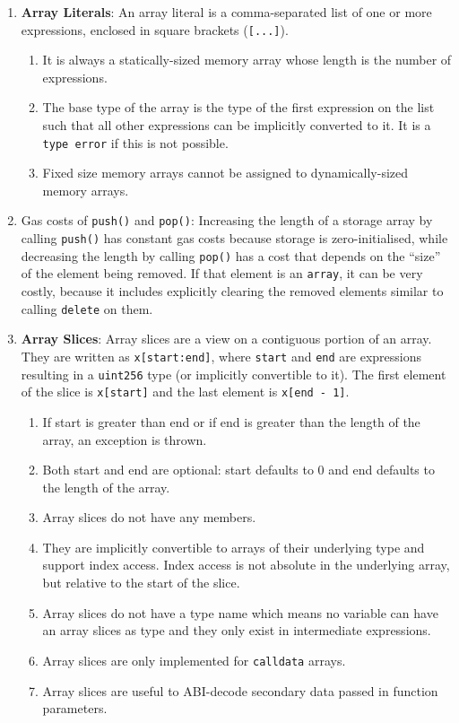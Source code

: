 \begin{enumerate}
\item\textbf{Array Literals}: An array literal is a comma-separated list of one or more expressions, enclosed in square brackets (\verb|[...]|).
    \begin{enumerate}
    \item It is always a statically-sized memory array whose length is the number of expressions.
    \item The base type of the array is the type of the first expression on the list such that all other expressions can be implicitly converted to it. It is a \verb|type error| if this is not possible.
    \item Fixed size memory arrays cannot be assigned to dynamically-sized memory arrays.
    \end{enumerate}

\item Gas costs of \verb|push()| and \verb|pop()|: Increasing the length of a storage array by calling \verb|push()| has constant gas costs because storage is zero-initialised, while decreasing the length by calling \verb|pop()| has a cost that depends on the “size” of the element being removed. If that element is an \verb|array|, it can be very costly, because it includes explicitly clearing the removed elements similar to calling \verb|delete| on them.

\item\textbf{Array Slices}: Array slices are a view on a contiguous portion of an array. They are written as \verb|x[start:end]|, where \verb|start| and \verb|end| are expressions resulting in a \verb|uint256| type (or implicitly convertible to it). The first element of the slice is \verb|x[start]| and the last element is \verb|x[end - 1]|.
    \begin{enumerate}
    \item If start is greater than end or if end is greater than the length of the array, an exception is thrown.
    \item Both start and end are optional: start defaults to 0 and end defaults to the length of the array.
    \item Array slices do not have any members.
    \item They are implicitly convertible to arrays of their underlying type and support index access. Index access is not absolute in the underlying array, but relative to the start of the slice.
    \item Array slices do not have a type name which means no variable can have an array slices as type and they only exist in intermediate expressions.
    \item Array slices are only implemented for \verb|calldata| arrays.
    \item Array slices are useful to ABI-decode secondary data passed in function parameters.
    \end{enumerate}


\end{enumerate}
